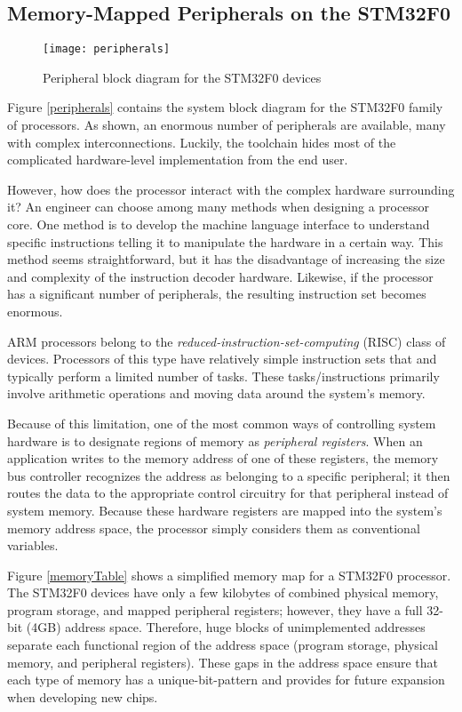 \documentclass[11pt,fleqn]{book} %
\begin{document}
\subsection{Memory-Mapped Peripherals on the STM32F0}

\begin{figure}[]
    \centering\texttt{[image: peripherals]}
    \caption{Peripheral block diagram for the STM32F0 devices}
    \label{peripherals}
\end{figure}

Figure \vref{peripherals} contains the system block diagram for the STM32F0 family of processors. As shown, an enormous number of peripherals are available, many with complex interconnections. Luckily, the toolchain hides most of the complicated hardware-level implementation from the end user.

However, how does the processor interact with the complex hardware surrounding it? An engineer can choose among many methods when designing a processor core. One method is to develop the machine language interface to understand specific instructions telling it to manipulate the hardware in a certain way. This method seems straightforward, but it has the disadvantage of increasing the size and complexity of the instruction decoder hardware. Likewise, if the processor has a significant number of peripherals, the resulting instruction set becomes enormous. 

ARM processors belong to the \textit{reduced-instruction-set-computing} (RISC) class of devices. Processors of this type have relatively simple instruction sets that and typically perform a limited number of tasks. These tasks/instructions primarily involve arithmetic operations and moving data around the system's memory.

Because of this limitation, one of the most common ways of controlling system hardware is to designate regions of memory as \textit{peripheral registers}. When an application writes to the memory address of one of these registers, the memory bus controller recognizes the address as belonging to a specific peripheral; it then routes the data to the appropriate control circuitry for that peripheral instead of system memory. Because these hardware registers are mapped into the system's memory address space, the processor simply considers them as conventional variables. 

Figure \vref{memoryTable} shows a simplified memory map for a STM32F0 processor. The STM32F0 devices have only a few kilobytes of combined physical memory, program storage, and mapped peripheral registers; however, they have a full 32-bit (4GB) address space. Therefore, huge blocks of unimplemented addresses separate each functional region of the address space (program storage, physical memory, and peripheral registers). These gaps in the address space ensure that each type of memory has a unique-bit-pattern and provides for future expansion when developing new chips. 
\end{document}
